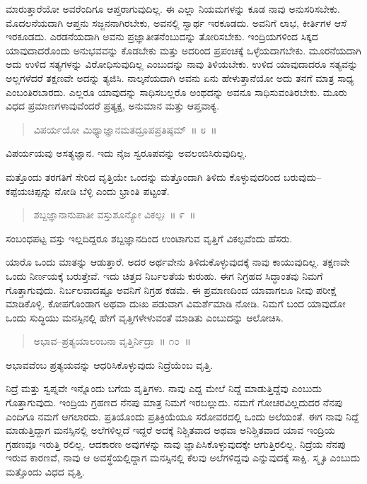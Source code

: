 ಮಾರುತ್ತಾರೆಯೋ ಅವರೆಂದಿಗೂ ಆಪ್ತರಾಗುವುದಿಲ್ಲ. ಈ ಎಲ್ಲಾ ನಿಯಮಗಳನ್ನು ಕೂಡ ನಾವು ಅನುಸರಿಸಬೇಕು. ಮೊದಲನೆಯದಾಗಿ ಆಪ್ತನು ಸಜ್ಜನನಾಗಿರಬೇಕು, ಅವನಲ್ಲಿ ಸ್ವಾರ್ಥ ಇರಕೂಡದು. ಅವನಿಗೆ ಲಾಭ, ಕೀರ್ತಿಗಳ ಆಸೆ ಇರಕೂಡದು. ಎರಡನೆಯದಾಗಿ ಅವನು ಪ್ರಜ್ಞಾತೀತನೆಂಬುದನ್ನು ತೋರಿಸಬೇಕು. ಇಂದ್ರಿಯಗಳಿಂದ ಸಿಕ್ಕದ ಯಾವುದಾದರೊಂದು ಅನುಭವವನ್ನು ಕೊಡಬೇಕು ಮತ್ತು ಅದರಿಂದ ಪ್ರಪಂಚಕ್ಕೆ ಒಳ್ಳೆಯದಾಗಬೇಕು. ಮೂರನೆಯದಾಗಿ ಅದು ಉಳಿದ ಸತ್ಯಗಳನ್ನು ವಿರೋಧಿಸುವುದಿಲ್ಲ ಎಂಬುದನ್ನು ನಾವು ತಿಳಿಯಬೇಕು. ಉಳಿದ ಯಾವುದಾದರೂ ಸತ್ಯವನ್ನು ಅಲ್ಲಗಳೆದರೆ ತಕ್ಷಣವೇ ಅದನ್ನು ತ್ಯಜಿಸಿ. ನಾಲ್ಕನೆಯದಾಗಿ ಅವನು ಏನು ಹೇಳುತ್ತಾನೆಯೋ ಅದು ತನಗೆ ಮಾತ್ರ ಸಾಧ್ಯ ಎಂಬಂತಿರಬಾರದು. ಎಲ್ಲರೂ ಯಾವುದನ್ನು ಸಾಧಿಸಬಲ್ಲರೊ ಅಂಥದನ್ನು ಅವನೂ ಸಾಧಿಸುವಂತಿರಬೇಕು. ಮೂರು ವಿಧದ ಪ್ರಮಾಣಗಳಾವುವೆಂದರೆ ಪ್ರತ್ಯಕ್ಷ, ಅನುಮಾನ ಮತ್ತು ಆಪ್ತವಾಕ್ಯ.

\begin{verse}
ವಿಪರ್ಯಯೋ ಮಿಥ್ಯಾಜ್ಞಾನಮತದ್ರೂಪಪ್ರತಿಷ್ಠಮ್​~॥ ೮~॥
\end{verse}

ವಿಪರ್ಯಯವು ಅಸತ್ಯಜ್ಞಾನ. ಇದು ನೈಜ ಸ್ವರೂಪವನ್ನು ಅವಲಂಬಿಸಿರುವುದಿಲ್ಲ. 

ಮತ್ತೊಂದು ತರಗತಿಗೆ ಸೇರಿದ ವೃತ್ತಿಯೇ ಒಂದನ್ನು ಮತ್ತೊಂದಾಗಿ ತಿಳಿದು ಕೊಳ್ಳುವುದರಿಂದ ಬರುವುದು–ಕಪ್ಪೆಯಚಿಪ್ಪನ್ನು ನೋಡಿ ಬೆಳ್ಳಿ ಎಂದು ಭ್ರಾಂತಿ ಪಟ್ಟಂತೆ.

\begin{verse}
ಶಬ್ದಜ್ಞಾನಾನುಪಾತೀ ವಸ್ತುಶೂನ್ಯೋ ವಿಕಲ್ಪಃ~॥ ೯~॥
\end{verse}

\vspace{-0.1cm}

ಸಂಬಂಧಪಟ್ಟ ವಸ್ತು ಇಲ್ಲದಿದ್ದರೂ ಶಬ್ದಜ್ಞಾನದಿಂದ ಉಂಟಾಗುವ ವೃತ್ತಿಗೆ ವಿಕಲ್ಪವೆಂದು ಹೆಸರು. 

ಯಾರೊ ಒಂದು ಮಾತನ್ನು ಆಡುತ್ತಾರೆ. ಅದರ ಅರ್ಥವೇನು ತಿಳಿದುಕೊಳ್ಳುವುದಕ್ಕೆ ನಾವು ಕಾಯುವುದಿಲ್ಲ. ತಕ್ಷಣವೇ ಒಂದು ನಿರ್ಣಯಕ್ಕೆ ಬರುತ್ತೇವೆ. ಇದು ಚಿತ್ತದ ನಿರ್ಬಲತೆಯ ಕುರುಹು. ಈಗ ನಿಗ್ರಹದ ಸಿದ್ಧಾಂತವು ನಿಮಗೆ ಗೊತ್ತಾಗುವುದು. ನಿರ್ಬಲವಾದಷ್ಟೂ ಅವನಿಗೆ ನಿಗ್ರಹ ಕಡಮೆ. ಈ ಪ್ರಮಾಣದಿಂದ ಯಾವಾಗಲೂ ನೀವು ಪರೀಕ್ಷೆ ಮಾಡಿಕೊಳ್ಳಿ. ಕೋಪಗೊಂಡಾಗ ಅಥವಾ ದುಃಖ ಪಡುವಾಗ ವಿಮರ್ಶೆಮಾಡಿ ನೋಡಿ. ನಿಮಗೆ ಬಂದ ಯಾವುದೋ ಒಂದು ಸುದ್ಧಿಯು ಮನಸ್ಸಿನಲ್ಲಿ ಹೇಗೆ ವೃತ್ತಿಗಳೇಳುವಂತೆ ಮಾಡಿತು ಎಂಬುದನ್ನು ಆಲೋಚಿಸಿ.

\begin{verse}
ಅಭಾವ–ಪ್ರತ್ಯಯಾಲಂಬನಾ ವೃತ್ತಿರ್ನಿದ್ರಾ~॥ ೧೦~॥
\end{verse}

\vspace{-0.2cm}

ಅಭಾವವೆಂಬ ಪ್ರತ್ಯಯವನ್ನು ಆಧರಿಸಿಕೊಳ್ಳುವುದು ನಿದ್ರೆಯೆಂಬ ವೃತ್ತಿ. 

ನಿದ್ರೆ ಮತ್ತು ಸ್ವಪ್ನವೇ ಇನ್ನೊಂದು ಬಗೆಯ ವೃತ್ತಿಗಳು. ನಾವು ಎದ್ದ ಮೇಲೆ ನಿದ್ದೆ ಮಾಡುತ್ತಿದ್ದೆವು ಎಂಬುದು ಗೊತ್ತಾಗುವುದು. ಇಂದ್ರಿಯ ಗ್ರಹಣದ ನೆನಪು ಮಾತ್ರ ನಿಮಗೆ ಇರಬಲ್ಲುದು. ನಮಗೆ ಗೋಚರವಿಲ್ಲದುದರ ನೆನಪು ಎಂದಿಗೂ ನಮಗೆ ಆಗಲಾರದು. ಪ್ರತಿಯೊಂದು ಪ್ರತಿಕ್ರಿಯೆಯೂ ಸರೋವರದಲ್ಲಿ ಒಂದು ಅಲೆಯಂತೆ. ಈಗ ನಾವು ನಿದ್ದೆ ಮಾಡುತ್ತಿದ್ದಾಗ ಮನಸ್ಸಿನಲ್ಲಿ ಅಲೆಗಳಿಲ್ಲದೆ ಇದ್ದರೆ ಅದಕ್ಕೆ ನಿಶ್ಚಿತವಾದ ಅಥವಾ ಅನಿಶ್ಚಿತವಾದ ಯಾವ ಇಂದ್ರಿಯ ಗ್ರಹಣವೂ ಇರುತ್ತಿ ರಲಿಲ್ಲ. ಆದಕಾರಣ ಅವುಗಳನ್ನು ನಾವು ಜ್ಞಾಪಿಸಿಕೊಳ್ಳುವುದಕ್ಕೇ ಆಗುತ್ತಿರಲಿಲ್ಲ. ನಿದ್ರೆಯ ನೆನಪು ಇರುವ ಕಾರಣವೆ, ನಾವು ಆ ಅವಸ್ಥೆಯಲ್ಲಿದ್ದಾಗ ಮನಸ್ಸಿನಲ್ಲಿ ಕೆಲವು ಅಲೆಗಳಿದ್ದವು ಎನ್ನುವುದಕ್ಕೆ ಸಾಕ್ಷಿ. ಸ್ಮೃತಿ ಎಂಬುದು ಮತ್ತೊಂದು ವಿಧದ ವೃತ್ತಿ. 

